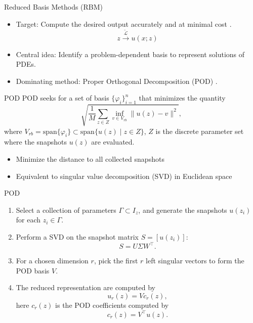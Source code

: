 \documentclass[10pt]{beamer}
\newcommand{\lv}{\lVert}
\newcommand{\rv}{\rVert}
\begin{document}
\begin{frame}{Reduced Basis Methods (RBM)}
\begin{itemize}
\item Target: Compute the desired output {\color{red} accurately} and at {\color{red} minimal} cost \cite{maday2006reduced}.
$$
z \xrightarrow{\mathcal{\tilde{L}}} u(x; z)
$$
\item Central idea: Identify a problem-dependent basis to represent solutions of PDEs.
\item Dominating method: Proper Orthogonal Decomposition (POD) \cite{hesthaven2016certified}.
\end{itemize}
\end{frame}

\begin{frame}{POD}
POD seeks for a set of basis $\{\varphi_i\}_{i=1}^n $ that minimizes the quantity \cite{hesthaven2016certified}
\begin{equation}
\sqrt{\frac{1}{M} \sum_{z \in Z} \inf_{v\in V_{rb}} \lv u(z) - v\rv^2},
\end{equation}
where $V_{rb} = \text{span}\{\varphi_i\} \subset \text{span}\{u(z) \mid z\in Z\}$, $Z$ is the discrete parameter set where the {\color{red} snapshots} $u(z)$ are evaluated.
\begin{itemize}
	\item Minimize the distance to all collected snapshots
	\item Equivalent to singular value decomposition (SVD) in Euclidean space
\end{itemize}
\end{frame}

\begin{frame}{POD}
\begin{enumerate}
	\item Select a collection of parameters $\Gamma \subset I_z $, and generate the snapshots $u(z_i)$ for each $z_i \in \Gamma $.
	\item Perform a SVD on the snapshot matrix $S = [u(z_i)]$:
	\begin{equation}
		S = U\Sigma W^\top.
	\end{equation}
	\item For a chosen dimension $r$, pick the first $r$ left singular vectors to form the POD basis $V$.
	\item The reduced representation are computed by 
	\begin{equation}
		u_r(z) = Vc_r(z),
	\end{equation}
	here $c_r(z) $ is the POD coefficients computed by
	\begin{equation}
		c_r(z) = V^\top u(z).
	\end{equation}
\end{enumerate}
\end{frame}
\end{document}
